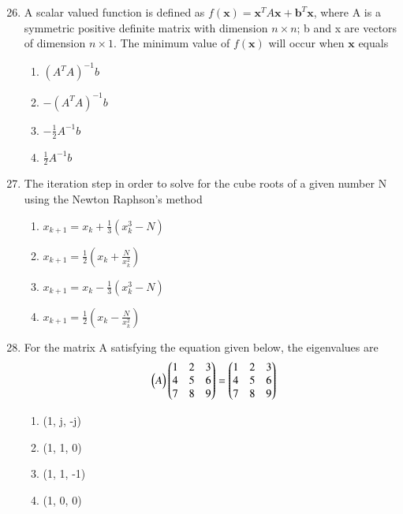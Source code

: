 \documentclass[journal,12pt,onecolumn]{IEEEtran}
\theoremstyle{remark}
\begin{document}
\clearpage
\begin{enumerate}
\setcounter{enumi}{25}
    \item A scalar valued function is defined as $f(\mathbf{x}) = \mathbf{x}^T A \mathbf{x} + \mathbf{b}^T \mathbf{x}$, where A is a symmetric positive definite matrix with dimension $n \times n$; b and x are vectors of dimension $n \times 1$. The minimum value of $f(\mathbf{x})$ will occur when $\mathbf{x}$ equals
    \begin{multicols}{2}
        \begin{enumerate}
            \item $(A^T A)^{-1} b$
            \item $-(A^T A)^{-1} b$
            \item $-\frac{1}{2} A^{-1} b$
            \item $\frac{1}{2} A^{-1} b$
        \end{enumerate}
    \end{multicols}

    \item The iteration step in order to solve for the cube roots of a given number N using the Newton Raphson's method
    \begin{multicols}{2}
        \begin{enumerate}
            \item $x_{k+1} = x_k + \frac{1}{3}(x_k^3 - N)$
            \item $x_{k+1} = \frac{1}{2} \left( x_k + \frac{N}{x_k^2} \right)$
            \item $x_{k+1} = x_k - \frac{1}{3}(x_k^3 - N)$
            \item $x_{k+1} = \frac{1}{2} \left( x_k - \frac{N}{x_k^2} \right)$
        \end{enumerate}
    \end{multicols}
    
    \item For the matrix A satisfying the equation given below, the eigenvalues are
    \[
        \begin{pmatrix}A\end{pmatrix}\begin{pmatrix}1 & 2 & 3 \\ 4 & 5 & 6 \\ 7 & 8 & 9\end{pmatrix}
         = \begin{pmatrix}1 & 2 & 3 \\ 4 & 5 & 6 \\ 7 & 8 & 9 \end{pmatrix}
    \]
    \begin{multicols}{2}
        \begin{enumerate}
            \item (1, j, -j)
            \item (1, 1, 0)
            \item (1, 1, -1)
            \item (1, 0, 0)
        \end{enumerate}
    \end{multicols}
    

\end{enumerate}
\end{document}
